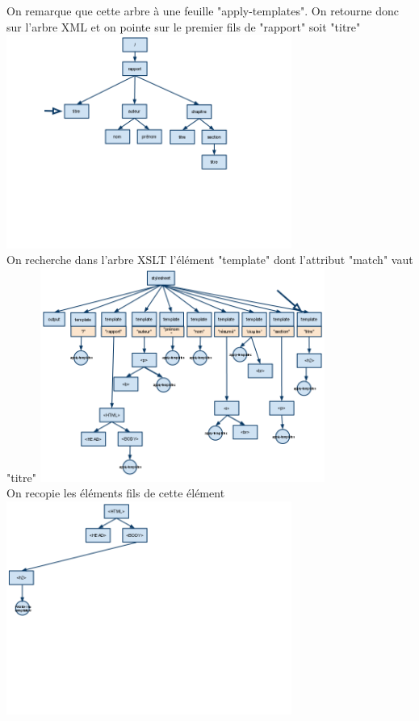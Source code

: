 \begin{center}
	        On remarque que cette arbre à une feuille "apply-templates". On retourne donc sur l'arbre XML et on pointe sur le premier fils de "rapport" soit "titre"
	        \includegraphics[width=0.7\textwidth]{img/XMLb.png}\\
	        
	        On recherche dans l'arbre XSLT l'élément "template" dont l'attribut "match" vaut "titre"
	        \includegraphics[width=0.7\textwidth]{img/XSLTb.png}\\
	        
	        On recopie les éléments fils de cette élément
	        \includegraphics[width=0.7\textwidth]{img/HTMLb.png}\\
	        

\end{center}
